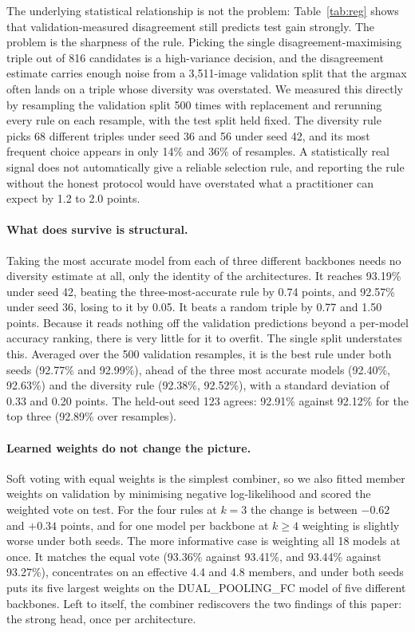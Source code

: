 \documentclass[runningheads]{llncs}
\begin{document}
The underlying statistical relationship is not the problem: Table~\ref{tab:reg}
shows that validation-measured disagreement still predicts test gain strongly.
The problem is the sharpness of the rule. Picking the single
disagreement-maximising triple out of 816 candidates is a high-variance
decision, and the disagreement estimate carries enough noise from a 3{,}511-image
validation split that the argmax often lands on a triple whose diversity was
overstated. We measured this directly by resampling the validation split 500
times with replacement and rerunning every rule on each resample, with the test
split held fixed. The diversity rule picks 68 different triples under seed 36
and 56 under seed 42, and its most frequent choice appears in only 14\% and
36\% of resamples. A statistically real signal does not automatically give a
reliable selection rule, and reporting the rule without the honest protocol
would have overstated what a practitioner can expect by 1.2 to 2.0 points.

\paragraph{What does survive is structural.}
Taking the most accurate model from each of three different backbones needs no
diversity estimate at all, only the identity of the architectures. It reaches
93.19\% under seed 42, beating the three-most-accurate rule by 0.74 points, and
92.57\% under seed 36, losing to it by 0.05. It beats a random triple by 0.77
and 1.50 points. Because it reads nothing off the validation predictions beyond
a per-model accuracy ranking, there is very little for it to overfit. The
single split understates this. Averaged over the 500 validation resamples, it
is the best rule under both seeds (92.77\% and 92.99\%), ahead of the three most
accurate models (92.40\%, 92.63\%) and the diversity rule (92.38\%, 92.52\%),
with a standard deviation of 0.33 and 0.20 points. The held-out seed 123
agrees: 92.91\% against 92.12\% for the top three (92.89\% over resamples).

\paragraph{Learned weights do not change the picture.}
Soft voting with equal weights is the simplest combiner, so we also fitted
member weights on validation by minimising negative log-likelihood and scored
the weighted vote on test. For the four rules at $k=3$ the change is between
$-0.62$ and $+0.34$ points, and for one model per backbone at $k \ge 4$
weighting is slightly worse under both seeds. The more informative case
is weighting all 18 models at once. It matches the equal vote (93.36\% against
93.41\%, and 93.44\% against 93.27\%), concentrates on an effective 4.4 and 4.8
members, and under both seeds puts its five largest weights on the
DUAL\_POOLING\_FC model of five different backbones. Left to itself, the
combiner rediscovers the two findings of this paper: the strong head, once per
architecture.
\end{document}
